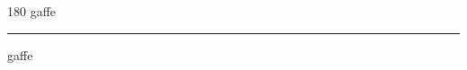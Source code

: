 
\begin{frame}
\begin{center}
\begin{turn}{180}
{\fontsize{2.5cm}{1em}\selectfont gaffe}
\end{turn}
\vspace{1em}\par  
\hrule
\vspace{1em}\par  
{\fontsize{2.5cm}{1em}\selectfont gaffe}
\end{center}
\end{frame}
